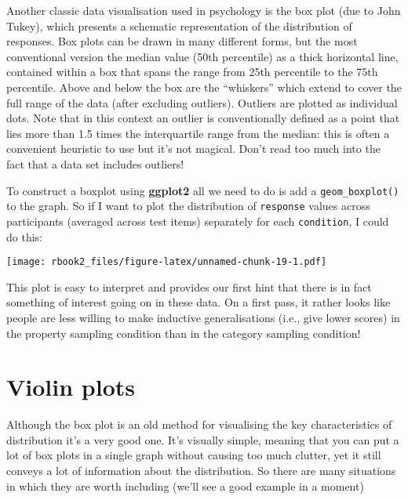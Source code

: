 \documentclass[]{book}
\newenvironment{Shaded}{\begin{snugshade}}{\end{snugshade}}
\newcommand{\DataTypeTok}[1]{\textcolor[rgb]{0.13,0.29,0.53}{#1}}
\newcommand{\KeywordTok}[1]{\textcolor[rgb]{0.13,0.29,0.53}{\textbf{#1}}}
\newcommand{\NormalTok}[1]{#1}
\newcommand{\OperatorTok}[1]{\textcolor[rgb]{0.81,0.36,0.00}{\textbf{#1}}}
\newcommand{\StringTok}[1]{\textcolor[rgb]{0.31,0.60,0.02}{#1}}
\begin{document}
Another classic data visualisation used in psychology is the box plot (due to John Tukey), which presents a schematic representation of the distribution of responses. Box plots can be drawn in many different forms, but the most conventional version the median value (50th percentile) as a thick horizontal line, contained within a box that spans the range from 25th percentile to the 75th percentile. Above and below the box are the ``whiskers'' which extend to cover the full range of the data (after excluding outliers).
Outliers are plotted as individual dots. Note that in this context an outlier is conventionally defined as a point that lies more than 1.5 times the interquartile range from the median: this is often a convenient heuristic to use but it's not magical. Don't read too much into the fact that a data set includes outliers!

To construct a boxplot using \textbf{ggplot2} all we need to do is add a \texttt{geom\_boxplot()} to the graph. So if I want to plot the distribution of \texttt{response} values across participants (averaged across test items) separately for each \texttt{condition}, I could do this:

\begin{Shaded}
\end{Shaded}

\texttt{[image: rbook2\_files/figure-latex/unnamed-chunk-19-1.pdf]}

This plot is easy to interpret and provides our first hint that there is in fact something of interest going on in these data. On a first pass, it rather looks like people are less willing to make inductive generalisations (i.e., give lower scores) in the property sampling condition than in the category sampling condition!

\hypertarget{violin-plots}{%
\section{Violin plots}\label{violin-plots}}

Although the box plot is an old method for visualising the key characteristics of distribution it's a very good one. It's visually simple, meaning that you can put a lot of box plots in a single graph without causing too much clutter, yet it still conveys a lot of information about the distribution. So there are many situations in which they are worth including (we'll see a good example in a moment)
\end{document}
